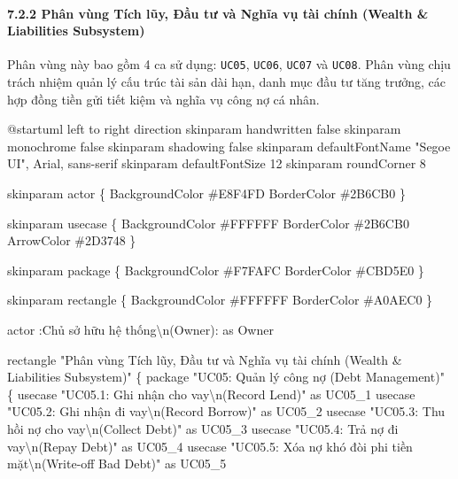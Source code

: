 \documentclass[11pt,a4paper]{article}
\newenvironment{Shaded}{}{}
\newcommand{\NormalTok}[1]{#1}
\begin{document}
\paragraph{7.2.2 Phân vùng Tích lũy, Đầu tư và Nghĩa vụ tài chính
(Wealth \& Liabilities
Subsystem)}\label{722-phuxe2n-vuxf9ng-tuxedch-lux169y-ux111ux1ea7u-tux1b0-vuxe0-nghux129a-vux1ee5-tuxe0i-chuxednh-wealth--liabilities-subsystem}

Phân vùng này bao gồm 4 ca sử dụng: \texttt{UC05}, \texttt{UC06},
\texttt{UC07} và \texttt{UC08}. Phân vùng chịu trách nhiệm quản lý cấu
trúc tài sản dài hạn, danh mục đầu tư tăng trưởng, các hợp đồng tiền gửi
tiết kiệm và nghĩa vụ công nợ cá nhân.

\iffalse
\begin{Shaded}
\begin{Highlighting}[]
\NormalTok{@startuml}
\NormalTok{left to right direction}
\NormalTok{skinparam handwritten false}
\NormalTok{skinparam monochrome false}
\NormalTok{skinparam shadowing false}
\NormalTok{skinparam defaultFontName "Segoe UI", Arial, sans{-}serif}
\NormalTok{skinparam defaultFontSize 12}
\NormalTok{skinparam roundCorner 8}

\NormalTok{skinparam actor \{}
\NormalTok{    BackgroundColor \#E8F4FD}
\NormalTok{    BorderColor \#2B6CB0}
\NormalTok{\}}

\NormalTok{skinparam usecase \{}
\NormalTok{    BackgroundColor \#FFFFFF}
\NormalTok{    BorderColor \#2B6CB0}
\NormalTok{    ArrowColor \#2D3748}
\NormalTok{\}}

\NormalTok{skinparam package \{}
\NormalTok{    BackgroundColor \#F7FAFC}
\NormalTok{    BorderColor \#CBD5E0}
\NormalTok{\}}

\NormalTok{skinparam rectangle \{}
\NormalTok{    BackgroundColor \#FFFFFF}
\NormalTok{    BorderColor \#A0AEC0}
\NormalTok{\}}

\NormalTok{actor :Chủ sở hữu hệ thống\textbackslash{}n(Owner): as Owner}

\NormalTok{rectangle "Phân vùng Tích lũy, Đầu tư và Nghĩa vụ tài chính (Wealth \& Liabilities Subsystem)" \{}
\NormalTok{    package "UC05: Quản lý công nợ (Debt Management)" \{}
\NormalTok{        usecase "UC05.1: Ghi nhận cho vay\textbackslash{}n(Record Lend)" as UC05\_1}
\NormalTok{        usecase "UC05.2: Ghi nhận đi vay\textbackslash{}n(Record Borrow)" as UC05\_2}
\NormalTok{        usecase "UC05.3: Thu hồi nợ cho vay\textbackslash{}n(Collect Debt)" as UC05\_3}
\NormalTok{        usecase "UC05.4: Trả nợ đi vay\textbackslash{}n(Repay Debt)" as UC05\_4}
\NormalTok{        usecase "UC05.5: Xóa nợ khó đòi phi tiền mặt\textbackslash{}n(Write{-}off Bad Debt)" as UC05\_5}
        

\end{Highlighting}
\end{Shaded}
\end{document}
